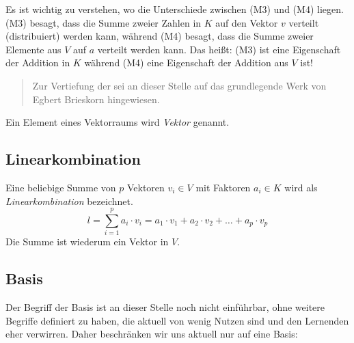 Es ist wichtig zu verstehen, wo die Unterschiede zwischen (M3) und (M4) liegen. (M3) besagt, dass die Summe zweier Zahlen in $K$ auf den Vektor $v$ verteilt (distribuiert) werden kann, während (M4) besagt, dass die Summe zweier Elemente aus $V$ auf $a$ verteilt werden kann. Das heißt: (M3) ist eine Eigenschaft der Addition in $K$ während (M4) eine Eigenschaft der Addition aus $V$ ist! 

\begin{quote}
Zur Vertiefung der sei an dieser Stelle auf das grundlegende Werk von Egbert Brieskorn \cite{Brieskorn1983} hingewiesen. 
\end{quote}

\begin{definition}
Ein Element eines Vektorraums wird \emph{Vektor} genannt.
\end{definition}

\subsection{Linearkombination}

\begin{definition}
Eine beliebige Summe von $p$ Vektoren $v_i \in V$ mit Faktoren $a_i \in K$ wird als \emph{Linearkombination} bezeichnet.
\[
l = \sum_{i=1}^{p} a_i \cdot v_i = a_1\cdot v_1 + a_2 \cdot v_2 + \dots + a_p \cdot v_p
\]
Die Summe ist wiederum ein Vektor in $V$.

\end{definition}

\subsection{Basis}

Der Begriff der Basis ist an dieser Stelle noch nicht einführbar, ohne weitere Begriffe definiert zu haben, die aktuell von wenig Nutzen sind und den Lernenden eher verwirren. Daher beschränken wir uns aktuell nur auf eine Basis:

